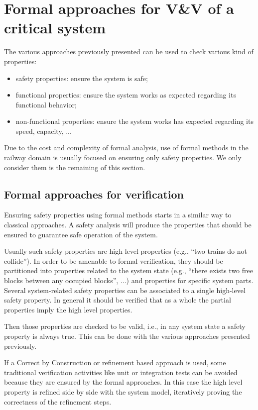 
\section{Formal approaches for V\&V of a critical system}

The various approaches previously presented can be used to check
various kind of properties:
\begin{itemize}
\item safety properties: ensure the system is safe;
\item functional properties: ensure the system works as expected
  regarding its functional behavior;
\item non-functional properties: ensure the system works has expected
  regarding its speed, capacity, ...
\end{itemize}

Due to the cost and complexity of formal analysis, use of formal
methods in the railway domain is usually focused on ensuring only
safety properties. We only consider them is the remaining of this
section.


\subsection{Formal approaches for verification}

Ensuring safety properties using formal methods starts in a similar
way to classical approaches. A safety analysis will produce the
properties that should be ensured to guarantee safe operation of the
system.

Usually such safety properties are high level properties (e.g., ``two
trains do not collide''). In order to be amenable to formal verification,
they should be partitioned into properties related to the system state
(e.g., ``there exists two free blocks between any occupied blocks'', ...)
and properties for specific system parts. Several system-related safety
properties can be associated to a single high-level safety property. In
general it should be verified that as a whole the partial properties
imply the high level properties.

Then those properties are checked to be valid, i.e., in any system
state a safety property is always true. This can be done with the
various approaches presented previously.

If a Correct by Construction or refinement based approach is used, some
traditional verification activities like unit or integration tests can be
avoided because they are ensured by the formal approaches. In this case
the high level property is refined side by side with the system model,
iteratively proving the correctness of the refinement steps.

